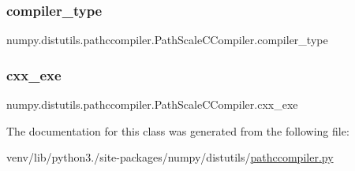 \subsubsection{\texorpdfstring{compiler\+\_\+type}{compiler\_type}}
{\footnotesize\ttfamily numpy.\+distutils.\+pathccompiler.\+Path\+Scale\+C\+Compiler.\+compiler\+\_\+type\hspace{0.3cm}{\ttfamily [static]}}

\mbox{\label{classnumpy_1_1distutils_1_1pathccompiler_1_1PathScaleCCompiler_ae25eea628b2ddcfbf7196a223d775b92}} 
\subsubsection{\texorpdfstring{cxx\+\_\+exe}{cxx\_exe}}
{\footnotesize\ttfamily numpy.\+distutils.\+pathccompiler.\+Path\+Scale\+C\+Compiler.\+cxx\+\_\+exe\hspace{0.3cm}{\ttfamily [static]}}



The documentation for this class was generated from the following file\+:\begin{DoxyCompactItemize}
\item 
venv/lib/python3./site-\/packages/numpy/distutils/\hyperlink{pathccompiler_8py}{pathccompiler.\+py}\end{DoxyCompactItemize}
